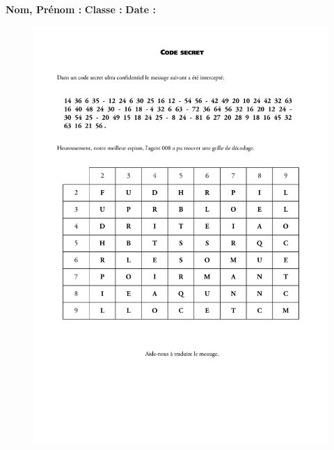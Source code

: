 



\textbf{Nom, Prénom :} \hspace{8cm} \textbf{Classe :} \hspace{3cm} \textbf{Date :}\\

\begin{figure}[H]
  \centering
  \includegraphics[width=0.8\linewidth]{4xDM/2-tables.pdf}
\end{figure}

\newpage

